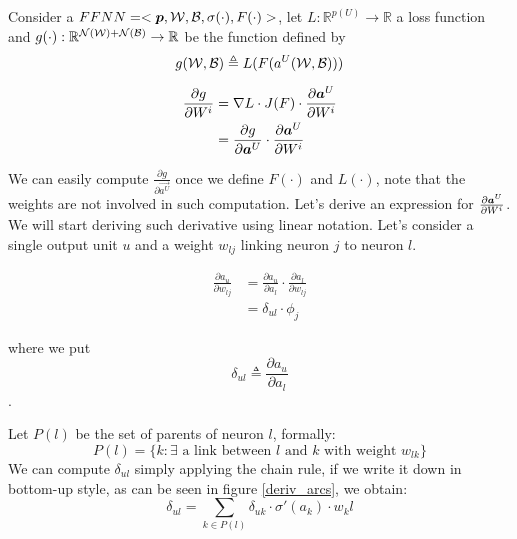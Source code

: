 Consider a $FFNN=<\boldsymbol{p},\mathcal{W},\mathcal{B},\sigma(\cdot),F(\cdot)>$, let $L:\mathbb{R}^{p(U)} \rightarrow \mathbb{R}$ a loss function and 
$g(\cdot):\mathbb{R}^{\mathcal{N}(\mathcal{W})+\mathcal{N}(\mathcal{B})} \rightarrow \mathbb{R}$ be the function defined by
$$g(\mathcal{W},\mathcal{B}) \triangleq L(F(a^U(\mathcal{W},\mathcal{B})))$$


\begin{align}
\frac{\partial g}{\partial W^i} &= \nabla L \cdot J(F) \cdot \frac{\partial \boldsymbol{a}^U}{\partial W^i}\\
&= \frac{\partial g}{\partial \boldsymbol{a}^U} \cdot \frac{\partial \boldsymbol{a}^U}{\partial W^i}
\end{align}


We can easily compute $\frac{\partial g}{\partial \vec{a^U}}$ once we define $F(\cdot)$ and $L(\cdot)$, note that the weights are not involved in such computation.
Let's derive an expression for $\frac{\partial \boldsymbol{a}^U}{\partial W^i}$.
We will start deriving such derivative using linear notation. Let's consider a single output unit $u$ and a weight $w_{lj}$ linking neuron $j$ to neuron $l$.


\begin{align}
\frac{\partial a_u}{\partial w_{lj}} &= \frac{\partial a_u}{\partial a_l} \cdot \frac{\partial a_l}{\partial w_{lj}}\\
&=\delta_{ul} \cdot \phi_j
\end{align}

where we put $$\delta_{ul} \triangleq \frac{\partial a_u}{\partial a_l}$$.

Let $P(l)$ be the set of parents of neuron $l$, formally:
\begin{equation} 
P(l) = \{ k: \exists \text{ a link between $l$ and $k$ with weight } w_{lk} \}
\end{equation}
We can compute $\delta_{ul}$ simply applying the chain rule, if we write it down in bottom-up style, as can be seen in figure \ref{deriv_arcs}, we obtain:
\begin{equation}
\delta_{ul} = \sum_{k\in P(l)} \delta_{uk} \cdot \sigma'(a_k)\cdot w_kl
\end{equation}

